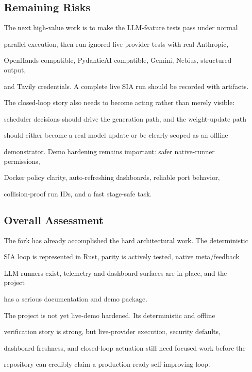 \documentclass[twocolumn,10pt,letterpaper]{article}
\begin{document}
\subsection{Remaining Risks}

The next high-value work is to make the LLM-feature tests pass under normal

parallel execution, then run ignored live-provider tests with real Anthropic,

OpenHands-compatible, PydanticAI-compatible, Gemini, Nebius, structured-output,

and Tavily credentials. A complete live SIA run should be recorded with artifacts.


The closed-loop story also needs to become acting rather than merely visible:

scheduler decisions should drive the generation path, and the weight-update path

should either become a real model update or be clearly scoped as an offline

demonstrator. Demo hardening remains important: safer native-runner permissions,

Docker policy clarity, auto-refreshing dashboards, reliable port behavior,

collision-proof run IDs, and a fast stage-safe task.


\subsection{Overall Assessment}

The fork has already accomplished the hard architectural work. The deterministic

SIA loop is represented in Rust, parity is actively tested, native meta/feedback

LLM runners exist, telemetry and dashboard surfaces are in place, and the project

has a serious documentation and demo package.


The project is not yet live-demo hardened. Its deterministic and offline

verification story is strong, but live-provider execution, security defaults,

dashboard freshness, and closed-loop actuation still need focused work before the

repository can credibly claim a production-ready self-improving loop.



\balance
\end{document}
